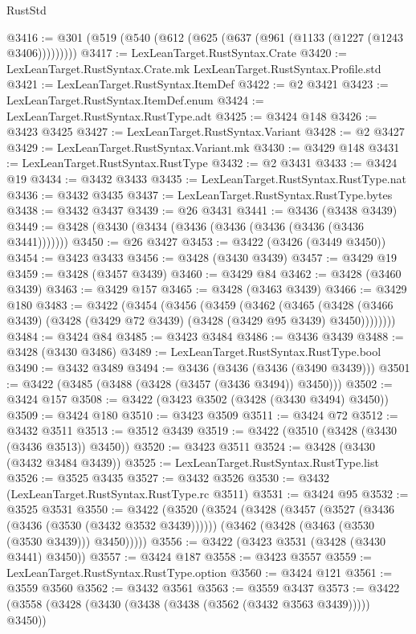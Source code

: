 \begin{lexlean}{RustStd}
\begin{coremodule}
@3416 := @301 (@519 (@540 (@612 (@625 (@637 (@961 (@1133 (@1227 (@1243 @3406)))))))))
@3417 := LexLeanTarget.RustSyntax.Crate
@3420 := LexLeanTarget.RustSyntax.Crate.mk LexLeanTarget.RustSyntax.Profile.std
@3421 := LexLeanTarget.RustSyntax.ItemDef
@3422 := @2 @3421
@3423 := LexLeanTarget.RustSyntax.ItemDef.enum
@3424 := LexLeanTarget.RustSyntax.RustType.adt
@3425 := @3424 @148
@3426 := @3423 @3425
@3427 := LexLeanTarget.RustSyntax.Variant
@3428 := @2 @3427
@3429 := LexLeanTarget.RustSyntax.Variant.mk
@3430 := @3429 @148
@3431 := LexLeanTarget.RustSyntax.RustType
@3432 := @2 @3431
@3433 := @3424 @19
@3434 := @3432 @3433
@3435 := LexLeanTarget.RustSyntax.RustType.nat
@3436 := @3432 @3435
@3437 := LexLeanTarget.RustSyntax.RustType.bytes
@3438 := @3432 @3437
@3439 := @26 @3431
@3441 := @3436 (@3438 @3439)
@3449 := @3428 (@3430 (@3434 (@3436 (@3436 (@3436 (@3436 (@3436 @3441)))))))
@3450 := @26 @3427
@3453 := @3422 (@3426 (@3449 @3450))
@3454 := @3423 @3433
@3456 := @3428 (@3430 @3439)
@3457 := @3429 @19
@3459 := @3428 (@3457 @3439)
@3460 := @3429 @84
@3462 := @3428 (@3460 @3439)
@3463 := @3429 @157
@3465 := @3428 (@3463 @3439)
@3466 := @3429 @180
@3483 := @3422
    (@3454
      (@3456
        (@3459
          (@3462
            (@3465
              (@3428 (@3466 @3439) (@3428 (@3429 @72 @3439) (@3428 (@3429 @95 @3439) @3450))))))))
@3484 := @3424 @84
@3485 := @3423 @3484
@3486 := @3436 @3439
@3488 := @3428 (@3430 @3486)
@3489 := LexLeanTarget.RustSyntax.RustType.bool
@3490 := @3432 @3489
@3494 := @3436 (@3436 (@3436 (@3490 @3439)))
@3501 := @3422 (@3485 (@3488 (@3428 (@3457 (@3436 @3494)) @3450)))
@3502 := @3424 @157
@3508 := @3422 (@3423 @3502 (@3428 (@3430 @3494) @3450))
@3509 := @3424 @180
@3510 := @3423 @3509
@3511 := @3424 @72
@3512 := @3432 @3511
@3513 := @3512 @3439
@3519 := @3422 (@3510 (@3428 (@3430 (@3436 @3513)) @3450))
@3520 := @3423 @3511
@3524 := @3428 (@3430 (@3432 @3484 @3439))
@3525 := LexLeanTarget.RustSyntax.RustType.list
@3526 := @3525 @3435
@3527 := @3432 @3526
@3530 := @3432 (LexLeanTarget.RustSyntax.RustType.rc @3511)
@3531 := @3424 @95
@3532 := @3525 @3531
@3550 := @3422
    (@3520
      (@3524
        (@3428
          (@3457 (@3527 (@3436 (@3436 (@3530 (@3432 @3532 @3439))))))
          (@3462 (@3428 (@3463 (@3530 (@3530 @3439))) @3450)))))
@3556 := @3422 (@3423 @3531 (@3428 (@3430 @3441) @3450))
@3557 := @3424 @187
@3558 := @3423 @3557
@3559 := LexLeanTarget.RustSyntax.RustType.option
@3560 := @3424 @121
@3561 := @3559 @3560
@3562 := @3432 @3561
@3563 := @3559 @3437
@3573 := @3422 (@3558 (@3428 (@3430 (@3438 (@3438 (@3562 (@3432 @3563 @3439))))) @3450))

\end{coremodule}
\end{lexlean}
